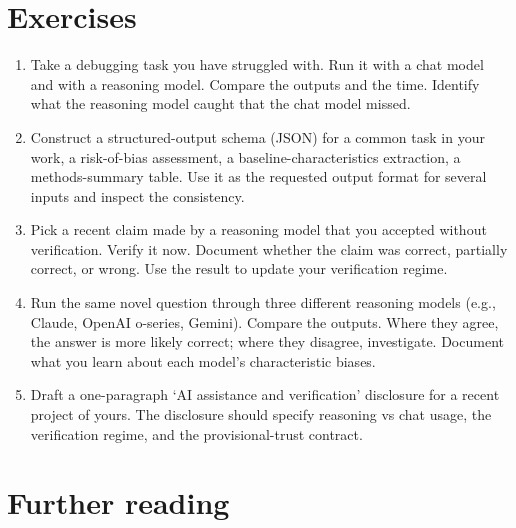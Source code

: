 \documentclass[
  letterpaper,
  11pt]{scrbook}
\begin{document}
\section{Exercises}\label{exercises-2}

\begin{enumerate}
\def\labelenumi{\arabic{enumi}.}
\item
  Take a debugging task you have struggled with. Run it with a chat
  model and with a reasoning model. Compare the outputs and the time.
  Identify what the reasoning model caught that the chat model missed.
\item
  Construct a structured-output schema (JSON) for a common task in your
  work, a risk-of-bias assessment, a baseline-characteristics
  extraction, a methods-summary table. Use it as the requested output
  format for several inputs and inspect the consistency.
\item
  Pick a recent claim made by a reasoning model that you accepted
  without verification. Verify it now. Document whether the claim was
  correct, partially correct, or wrong. Use the result to update your
  verification regime.
\item
  Run the same novel question through three different reasoning models
  (e.g., Claude, OpenAI o-series, Gemini). Compare the outputs. Where
  they agree, the answer is more likely correct; where they disagree,
  investigate. Document what you learn about each model's characteristic
  biases.
\item
  Draft a one-paragraph `AI assistance and verification' disclosure for
  a recent project of yours. The disclosure should specify reasoning vs
  chat usage, the verification regime, and the provisional-trust
  contract.
\end{enumerate}

\section{Further reading}\label{further-reading-2}
\end{document}
